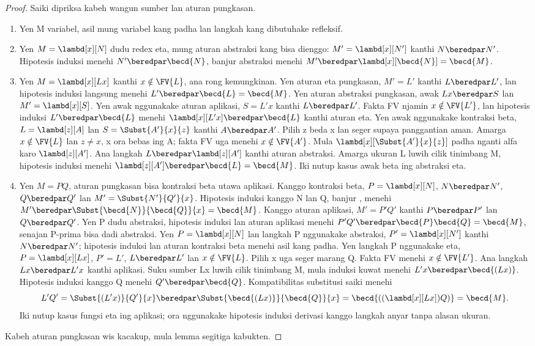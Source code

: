 \documentclass[../../../include/open-logic-section]{subfiles}
\begin{document}
\begin{proof}
  Saiki dipriksa kabeh wangun sumber lan aturan pungkasan.
  \begin{enumerate}
  \item Yen M variabel, asil mung variabel kang padha lan langkah kang dibutuhake refleksif.
  \item Yen $M=\lambd[x][N]$ dudu redex eta, mung aturan abstraksi kang bisa dienggo: $M'=\lambd[x][N']$ kanthi $N\beredpar N'$. Hipotesis induksi menehi $N'\beredpar\becd{N}$, banjur abstraksi menehi $M'\beredpar\lambd[x][\becd{N}]=\becd{M}$.
  \item Yen $M=\lambd[x][Lx]$ kanthi $x\notin\FV{L}$, ana rong kemungkinan. Yen aturan eta pungkasan, $M'=L'$ kanthi $L\beredpar L'$, lan hipotesis induksi langsung menehi $L'\beredpar\becd{L}=\becd{M}$. Yen aturan abstraksi pungkasan, awak $Lx\beredpar S$ lan $M'=\lambd[x][S]$. Yen awak nggunakake aturan aplikasi, $S=L'x$ kanthi $L\beredpar L'$. Fakta FV njamin $x\notin\FV{L'}$, lan hipotesis induksi $L'\beredpar\becd{L}$ menehi $\lambd[x][L'x]\beredpar\becd{L}$ kanthi aturan eta. Yen awak nggunakake kontraksi beta, $L=\lambd[z][A]$ lan $S=\Subst{A'}{x}{z}$ kanthi $A\beredpar A'$. Pilih z beda x lan seger supaya panggantian aman. Amarga $x\notin\FV{L}$ lan $z\neq x$, x ora bebas ing A; fakta FV uga menehi $x\notin\FV{A'}$. Mula $\lambd[x][\Subst{A'}{x}{z}]$ padha nganti alfa karo $\lambd[z][A']$. Ana langkah $L\beredpar\lambd[z][A']$ kanthi aturan abstraksi. Amarga ukuran L luwih cilik tinimbang M, hipotesis induksi menehi $\lambd[z][A']\beredpar\becd{L}=\becd{M}$. Iki nutup kasus awak beta ing abstraksi eta.
  \item Yen $M=PQ$, aturan pungkasan bisa kontraksi beta utawa aplikasi. Kanggo kontraksi beta, $P=\lambd[x][N]$, $N\beredpar N'$, $Q\beredpar Q'$ lan $M'=\Subst{N'}{Q'}{x}$. Hipotesis induksi kanggo N lan Q, banjur , menehi $M'\beredpar\Subst{\becd{N}}{\becd{Q}}{x}=\becd{M}$. Kanggo aturan aplikasi, $M'=P'Q'$ kanthi $P\beredpar P'$ lan $Q\beredpar Q'$. Yen P dudu abstraksi, hipotesis induksi lan aturan aplikasi menehi $P'Q'\beredpar\becd{P}\becd{Q}=\becd{M}$, senajan P-prima bisa dadi abstraksi. Yen $P=\lambd[x][N]$ lan langkah P nggunakake abstraksi, $P'=\lambd[x][N']$ kanthi $N\beredpar N'$; hipotesis induksi lan aturan kontraksi beta menehi asil kang padha.
  Yen langkah P nggunakake eta, $P=\lambd[x][Lx]$, $P'=L'$, $L\beredpar L'$ lan $x\notin\FV{L}$. Pilih x uga seger marang Q. Fakta FV menehi $x\notin\FV{L'}$. Ana langkah $Lx\beredpar L'x$ kanthi aplikasi. Suku sumber Lx luwih cilik tinimbang M, mula induksi kuwat menehi $L'x\beredpar\becd{(Lx)}$. Hipotesis induksi kanggo Q menehi $Q'\beredpar\becd{Q}$. Kompatibilitas substitusi saiki menehi
  \[
    L'Q'=\Subst{(L'x)}{Q'}{x}
    \beredpar\Subst{\becd{(Lx)}}{\becd{Q}}{x}
    =\becd{((\lambd[x][Lx])Q)}=\becd{M}.
  \]
  Iki nutup kasus fungsi eta ing aplikasi; ora nggunakake hipotesis induksi derivasi kanggo langkah anyar tanpa alasan ukuran.
  \end{enumerate}
  Kabeh aturan pungkasan wis kacakup, mula lemma segitiga kabukten.
\end{proof}
\end{document}

